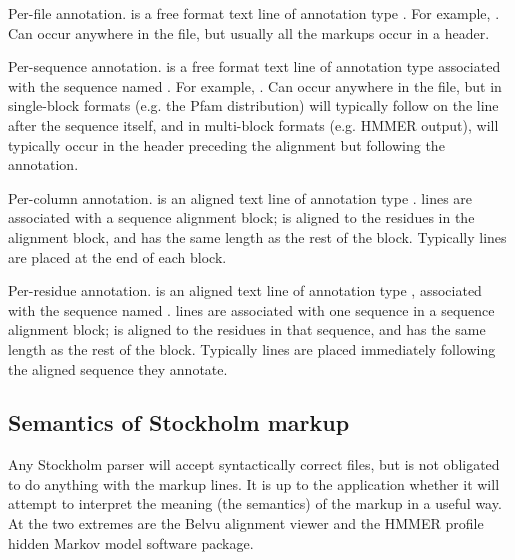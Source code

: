 \begin{sreitems}{}
\item [\emcode{\#=GF <tag> <s>}]
	Per-file annotation.  is a free format text line
	of annotation type . For example, . Can occur anywhere in the file, but usually
	all the  markups occur in a header.

\item [\emcode{\#=GS <seqname> <tag> <s>}]
	Per-sequence annotation.  is a free format text line
	of annotation type  associated with the sequence
	named . For example, . Can occur anywhere
	in the file, but in single-block formats (e.g. the Pfam
	distribution) will typically follow on the line after the
	sequence itself, and in multi-block formats (e.g. HMMER
	output), will typically occur in the header preceding the
	alignment but following the  annotation.

\item [\emcode{\#=GC <tag> <..s..>}]
	Per-column annotation.  is an aligned text line
	of annotation type .
         lines are
	associated with a sequence alignment block; 
	is aligned to the residues in the alignment block, and has
	the same length as the rest of the block.
	Typically  lines are placed at the end of each block.

\item [\emcode{\#=GR <seqname> <tag> <..s..>}]
	Per-residue annotation.  is an aligned text line
	of annotation type , associated with the sequence
	named . 
	 lines are 
	associated with one sequence in a sequence alignment block; 
	is aligned to the residues in that sequence, and has
	the same length as the rest of the block.
	Typically
         lines are placed immediately following the
	aligned	sequence they annotate.
\end{sreitems}

\subsection{Semantics of Stockholm markup}

Any Stockholm parser will accept syntactically correct files, but is
not obligated to do anything with the markup lines. It is up to the
application whether it will attempt to interpret the meaning (the
semantics) of the markup in a useful way. At the two extremes are the
Belvu alignment viewer and the HMMER profile hidden Markov model
software package.

